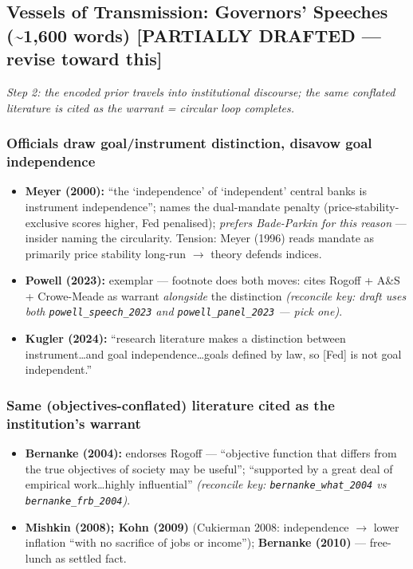 \documentclass[12pt,a4paper]{article}
\begin{document}
\begin{doublespace}
\subsection{Vessels of Transmission: Governors' Speeches (\textasciitilde1,600 words) [PARTIALLY DRAFTED --- revise toward this]}

\textit{Step 2: the encoded prior travels into institutional discourse; the same conflated literature is cited as the warrant = circular loop completes.}

\subsubsection{Officials draw goal/instrument distinction, disavow goal independence}
\begin{itemize}
    \item \textbf{Meyer (2000):} ``the `independence' of `independent' central banks is instrument independence''; names the dual-mandate penalty (price-stability-exclusive scores higher, Fed penalised); \textit{prefers Bade-Parkin for this reason} --- insider naming the circularity. Tension: Meyer (1996) reads mandate as primarily price stability long-run $\rightarrow$ theory defends indices.
    \item \textbf{Powell (2023):} exemplar --- footnote does both moves: cites Rogoff + A\&S + Crowe-Meade as warrant \textit{alongside} the distinction \textit{(reconcile key: draft uses both \texttt{powell\_speech\_2023} and \texttt{powell\_panel\_2023} --- pick one)}.
    \item \textbf{Kugler (2024):} ``research literature makes a distinction between instrument\ldots and goal independence\ldots goals defined by law, so [Fed] is not goal independent.''
\end{itemize}

\subsubsection{Same (objectives-conflated) literature cited as the institution's warrant}
\begin{itemize}
    \item \textbf{Bernanke (2004):} endorses Rogoff --- ``objective function that differs from the true objectives of society may be useful''; ``supported by a great deal of empirical work\ldots highly influential'' \textit{(reconcile key: \texttt{bernanke\_what\_2004} vs \texttt{bernanke\_frb\_2004})}.
    \item \textbf{Mishkin (2008); Kohn (2009)} (Cukierman 2008: independence $\rightarrow$ lower inflation ``with no sacrifice of jobs or income''); \textbf{Bernanke (2010)} --- free-lunch as settled fact.
\end{itemize}


\end{doublespace}
\end{document}
